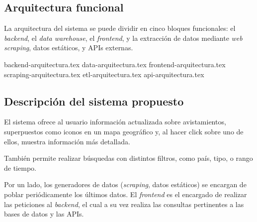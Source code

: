 \subsection{Arquitectura funcional}
La arquitectura del sistema se puede dividir en cinco bloques funcionales: el \textit{backend}, el \textit{data warehouse}, el \textit{frontend}, y la extracción de datos mediante \textit{web scraping}, datos estáticos, y APIs externas.

{backend-arquitectura.tex}
{data-arquitectura.tex}
{frontend-arquitectura.tex}
{scraping-arquitectura.tex}
{etl-arquitectura.tex}
{api-arquitectura.tex}



\subsection{Descripción del sistema propuesto}
El sistema ofrece al usuario información actualizada sobre avistamientos,
superpuestos como iconos en un mapa geográfico y, al hacer click sobre uno de
ellos, muestra información más detallada.

También permite realizar búsquedas con distintos filtros, como país, tipo, o rango de tiempo.

Por un lado, los generadores de datos (\textit{scraping}, datos estáticos) se encargan de poblar periódicamente los últimos datos. El \textit{frontend} es el encargado de realizar las peticiones al \textit{backend}, el cual a su vez realiza las consultas pertinentes a las bases de datos y las APIs.